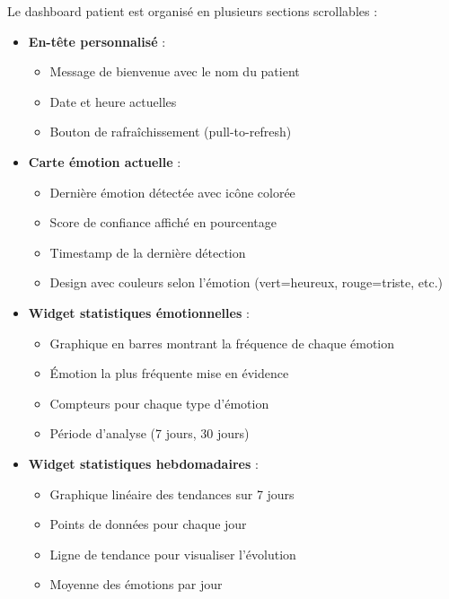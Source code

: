 \documentclass[a4paper,11pt]{report}
\begin{document}
Le dashboard patient est organisé en plusieurs sections scrollables :

\begin{itemize}
    \item \textbf{En-tête personnalisé} :
    \begin{itemize}
        \item Message de bienvenue avec le nom du patient
        \item Date et heure actuelles
        \item Bouton de rafraîchissement (pull-to-refresh)
    \end{itemize}
    
    \item \textbf{Carte émotion actuelle} :
    \begin{itemize}
        \item Dernière émotion détectée avec icône colorée
        \item Score de confiance affiché en pourcentage
        \item Timestamp de la dernière détection
        \item Design avec couleurs selon l'émotion (vert=heureux, rouge=triste, etc.)
    \end{itemize}
    
    \item \textbf{Widget statistiques émotionnelles} :
    \begin{itemize}
        \item Graphique en barres montrant la fréquence de chaque émotion
        \item Émotion la plus fréquente mise en évidence
        \item Compteurs pour chaque type d'émotion
        \item Période d'analyse (7 jours, 30 jours)
    \end{itemize}
    
    \item \textbf{Widget statistiques hebdomadaires} :
    \begin{itemize}
        \item Graphique linéaire des tendances sur 7 jours
        \item Points de données pour chaque jour
        \item Ligne de tendance pour visualiser l'évolution
        \item Moyenne des émotions par jour
    \end{itemize}
    

\end{itemize}
\end{document}
